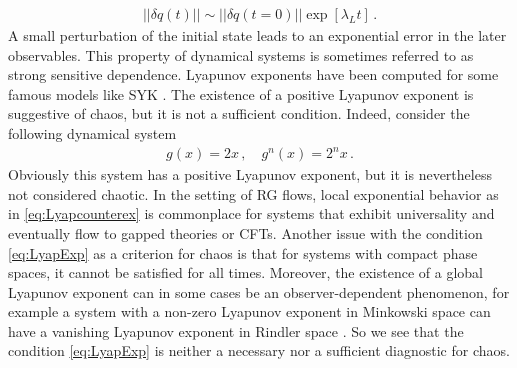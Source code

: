 \begin{subappendices}
\begin{gather}
\left|\left|\delta q(t)\right|\right| \sim \left|\left|\delta q(t=0)\right|\right| \exp\left[\lambda_L t \right]\,. \label{eq:LyapExp}
\end{gather}
A small perturbation of the initial state leads to an exponential error in the later observables. This property of dynamical systems is sometimes referred to as strong sensitive dependence.
Lyapunov exponents have been computed for some famous models like SYK \cite{maldacena2016remarks}. The existence of a positive Lyapunov exponent is suggestive of chaos, but it is not a sufficient condition. Indeed, consider the following dynamical system
\begin{gather}
    g(x) = 2 x\,, \quad g^n(x) = 2^n x\,. \label{eq:Lyapcounterex}
\end{gather}
Obviously this system has a positive Lyapunov exponent, but it is nevertheless not considered chaotic. In the setting of RG flows, local exponential behavior as in \cref{eq:Lyapcounterex} is commonplace for systems that exhibit universality and eventually flow to gapped theories or CFTs. Another issue with the condition \cref{eq:LyapExp} as a criterion for chaos is that for systems with compact phase spaces, it cannot be satisfied for all times. Moreover, the existence of a global Lyapunov exponent can in some cases be an observer-dependent phenomenon, for example a system with a non-zero Lyapunov exponent in Minkowski space can have a vanishing Lyapunov exponent in Rindler space \cite{zheng2003observer}. So we see that the condition \cref{eq:LyapExp} is neither a necessary nor a sufficient diagnostic for chaos. 


\end{subappendices}

